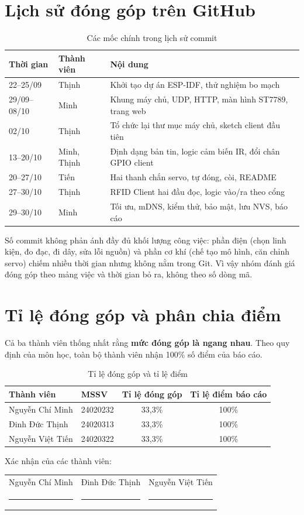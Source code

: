 \section{Lịch sử đóng góp trên GitHub}
\begin{table}[H]
\centering\small
\caption{Các mốc chính trong lịch sử commit}\label{tab:timeline}
\begin{tabularx}{\linewidth}{@{}llX@{}}
\toprule
\textbf{Thời gian} & \textbf{Thành viên} & \textbf{Nội dung} \\ \midrule
22–25/09 & Thịnh & Khởi tạo dự án ESP-IDF, thử nghiệm bo mạch \\
29/09–08/10 & Minh & Khung máy chủ, UDP, HTTP, màn hình ST7789, trang web \\
02/10 & Thịnh & Tổ chức lại thư mục máy chủ, sketch client đầu tiên \\
13–20/10 & Minh, Thịnh & Định dạng bản tin, logic cảm biến IR, đổi chân GPIO client \\
20–27/10 & Tiến & Hai thanh chắn servo, tự đóng, còi, README \\
27–30/10 & Thịnh & RFID Client hai đầu đọc, logic vào/ra theo cổng \\
29–30/10 & Minh & Tối ưu, mDNS, kiểm thử, bảo mật, lưu NVS, báo cáo \\
\bottomrule
\end{tabularx}
\end{table}

Số commit không phản ánh đầy đủ khối lượng công việc: phần điện (chọn linh kiện, đo
đạc, đi dây, sửa lỗi nguồn) và phần cơ khí (chế tạo mô hình, căn chỉnh servo) chiếm
nhiều thời gian nhưng không nằm trong Git. Vì vậy nhóm đánh giá đóng góp theo mảng
việc và thời gian bỏ ra, không theo số dòng mã.

\section{Tỉ lệ đóng góp và phân chia điểm}
Cả ba thành viên thống nhất rằng \textbf{mức đóng góp là ngang nhau}. Theo quy định
của môn học, toàn bộ thành viên nhận 100\% số điểm của báo cáo.

\begin{table}[H]
\centering\small
\caption{Tỉ lệ đóng góp và tỉ lệ điểm}\label{tab:diem}
\begin{tabular}{@{}llcc@{}}
\toprule
\textbf{Thành viên} & \textbf{MSSV} & \textbf{Tỉ lệ đóng góp} & \textbf{Tỉ lệ điểm báo cáo} \\ \midrule
Nguyễn Chí Minh & 24020232 & 33,3\% & 100\% \\
Đinh Đức Thịnh & 24020313 & 33,3\% & 100\% \\
Nguyễn Việt Tiến & 24020322 & 33,3\% & 100\% \\
\bottomrule
\end{tabular}
\end{table}

\vspace{1cm}
\noindent Xác nhận của các thành viên:
\par\vspace{0.5cm}
\noindent
\begin{tabular*}{\linewidth}{@{\extracolsep{\fill}}ccc@{}}
Nguyễn Chí Minh & Đinh Đức Thịnh & Nguyễn Việt Tiến \\[1.6cm]
\rule{3.6cm}{0.4pt} & \rule{3.6cm}{0.4pt} & \rule{3.6cm}{0.4pt} \\
\end{tabular*}
